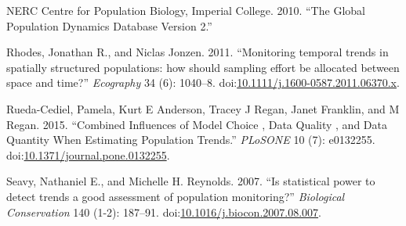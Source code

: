 \documentclass[11pt,]{article}
\begin{document}
\hypertarget{ref-GPDD2010}{}
NERC Centre for Population Biology, Imperial College. 2010. ``The Global
Population Dynamics Database Version 2.''

\hypertarget{ref-Rhodes2011}{}
Rhodes, Jonathan R., and Niclas Jonzen. 2011. ``Monitoring temporal
trends in spatially structured populations: how should sampling effort
be allocated between space and time?'' \emph{Ecography} 34 (6): 1040--8.
doi:\href{https://doi.org/10.1111/j.1600-0587.2011.06370.x}{10.1111/j.1600-0587.2011.06370.x}.

\hypertarget{ref-Rueda-Cediel2015}{}
Rueda-Cediel, Pamela, Kurt E Anderson, Tracey J Regan, Janet Franklin,
and M Regan. 2015. ``Combined Influences of Model Choice , Data Quality
, and Data Quantity When Estimating Population Trends.'' \emph{PLoSONE}
10 (7): e0132255.
doi:\href{https://doi.org/10.1371/journal.pone.0132255}{10.1371/journal.pone.0132255}.

\hypertarget{ref-Seavy2007}{}
Seavy, Nathaniel E., and Michelle H. Reynolds. 2007. ``Is statistical
power to detect trends a good assessment of population monitoring?''
\emph{Biological Conservation} 140 (1-2): 187--91.
doi:\href{https://doi.org/10.1016/j.biocon.2007.08.007}{10.1016/j.biocon.2007.08.007}.
\end{document}
